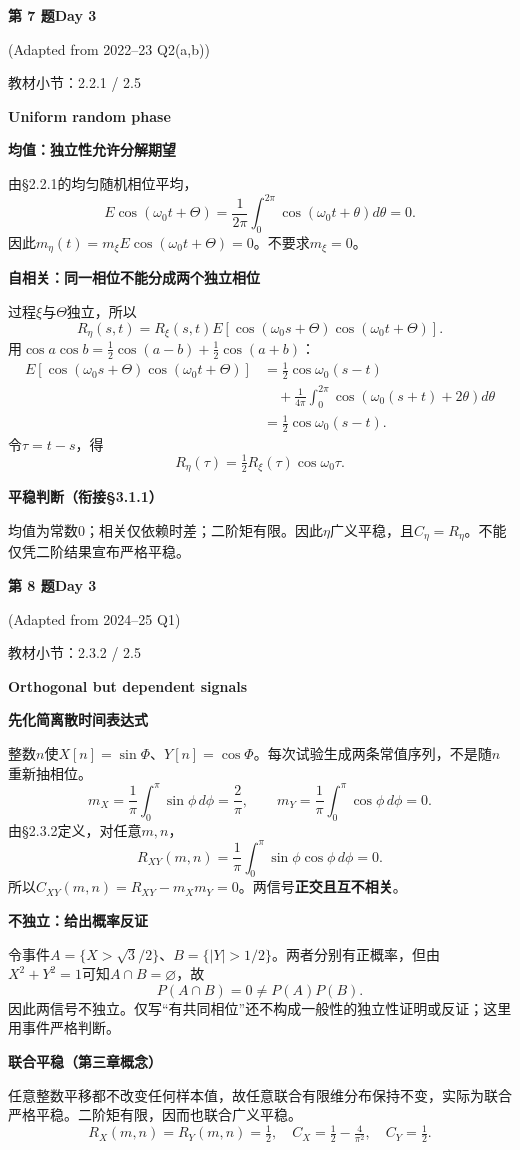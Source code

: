 \documentclass[10.5pt,fontset=fandol]{ctexart}
\newcommand{\key}[1]{\par\vspace{4pt}\noindent\textbf{\color{navy}#1}\par\vspace{2pt}}
\newcommand{\qtitle}[2]{\par\addvspace{1.2em}\Needspace{8\baselineskip}\begin{tcolorbox}[colback=navy,colframe=navy,arc=1.5pt,boxrule=0pt]\color{white}\large\bfseries #1\hfill\small #2\end{tcolorbox}}
\begin{document}
\qtitle{第 7 题}{Day 3}
{\small\color{accentred}(Adapted from 2022--23 Q2(a,b))}\par\smallskip
{\small\color{muted}教材小节：2.2.1 / 2.5}\par\medskip
\noindent\textbf{Uniform random phase}\par\smallskip\begin{tcolorbox}[breakable,colback=qbg,colframe=qbg,boxrule=0pt]\key{均值：独立性允许分解期望}
由§2.2.1的均匀随机相位平均，
\[E\cos(\omega_0t+\Theta)=\frac1{2\pi}\int_0^{2\pi}\cos(\omega_0t+\theta)d\theta=0.\]
因此$m_\eta(t)=m_\xi E\cos(\omega_0t+\Theta)=0$。不要求$m_\xi=0$。
\key{自相关：同一相位不能分成两个独立相位}
过程$\xi$与$\Theta$独立，所以
\[R_\eta(s,t)=R_\xi(s,t)E[\cos(\omega_0s+\Theta)\cos(\omega_0t+\Theta)].\]
用$\cos a\cos b=\tfrac12\cos(a-b)+\tfrac12\cos(a+b)$：
\[\begin{aligned}E[\cos(\omega_0s+\Theta)\cos(\omega_0t+\Theta)]
&=\tfrac12\cos\omega_0(s-t)\\&\quad+\frac1{4\pi}\int_0^{2\pi}\cos(\omega_0(s+t)+2\theta)d\theta\\
&=\tfrac12\cos\omega_0(s-t).\end{aligned}\]
令$\tau=t-s$，得
\[\boxed{R_\eta(\tau)=\tfrac12R_\xi(\tau)\cos\omega_0\tau.}\]
\key{平稳判断（衔接§3.1.1）}
均值为常数0；相关仅依赖时差；二阶矩有限。因此$\eta$广义平稳，且$C_\eta=R_\eta$。不能仅凭二阶结果宣布严格平稳。

\end{tcolorbox}
\qtitle{第 8 题}{Day 3}
{\small\color{accentred}(Adapted from 2024--25 Q1)}\par\smallskip
{\small\color{muted}教材小节：2.3.2 / 2.5}\par\medskip
\noindent\textbf{Orthogonal but dependent signals}\par\smallskip\begin{tcolorbox}[breakable,colback=qbg,colframe=qbg,boxrule=0pt]\key{先化简离散时间表达式}
整数$n$使$X[n]=\sin\Phi$、$Y[n]=\cos\Phi$。每次试验生成两条常值序列，不是随$n$重新抽相位。
\[m_X=\frac1\pi\int_0^\pi\sin\phi\,d\phi=\frac2\pi,\qquad m_Y=\frac1\pi\int_0^\pi\cos\phi\,d\phi=0.\]
由§2.3.2定义，对任意$m,n$，
\[R_{XY}(m,n)=\frac1\pi\int_0^\pi\sin\phi\cos\phi\,d\phi=0.\]
所以$C_{XY}(m,n)=R_{XY}-m_Xm_Y=0$。两信号\textbf{正交且互不相关}。
\key{不独立：给出概率反证}
令事件$A=\{X>\sqrt3/2\}$、$B=\{|Y|>1/2\}$。两者分别有正概率，但由$X^2+Y^2=1$可知$A\cap B=\varnothing$，故
\[P(A\cap B)=0\ne P(A)P(B).\]
因此两信号不独立。仅写“有共同相位”还不构成一般性的独立性证明或反证；这里用事件严格判断。
\key{联合平稳（第三章概念）}
任意整数平移都不改变任何样本值，故任意联合有限维分布保持不变，实际为联合严格平稳。二阶矩有限，因而也联合广义平稳。
\[R_X(m,n)=R_Y(m,n)=\tfrac12,\quad C_X=\tfrac12-\tfrac4{\pi^2},\quad C_Y=\tfrac12.\]

\end{tcolorbox}
\end{document}
